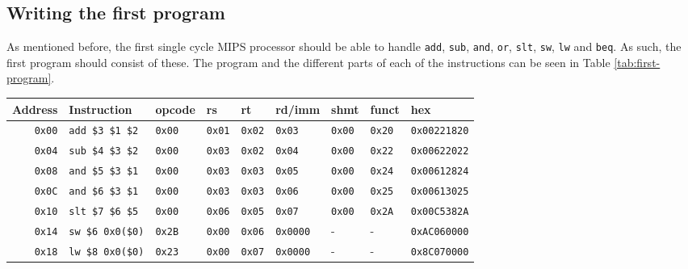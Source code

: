 \subsection{Writing the first program}
As mentioned before, the first single cycle MIPS processor should be able to
handle \texttt{add}, \texttt{sub}, \texttt{and}, \texttt{or}, \texttt{slt},
\texttt{sw}, \texttt{lw} and \texttt{beq}. As such, the first program should
consist of these. The program and the different parts of each of the
instructions can be seen in Table \ref{tab:first-program}.
\begin{table}
    \centering
    \begin{tabular}{rllllllll}
        \toprule
        Address & Instruction & opcode & rs & rt & rd/imm & shmt & funct & hex \\
        \midrule
        \texttt{0x00} & \texttt{add \$3 \$1 \$2} & \texttt{0x00} &
        \texttt{0x01} & \texttt{0x02} & \texttt{0x03} & \texttt{0x00} &
        \texttt{0x20} & \texttt{0x00221820} \\ %

        \texttt{0x04} & \texttt{sub \$4 \$3 \$2} & \texttt{0x00} &
        \texttt{0x03} & \texttt{0x02} & \texttt{0x04} & \texttt{0x00} &
        \texttt{0x22} & \texttt{0x00622022} \\ %

        \texttt{0x08} & \texttt{and \$5 \$3 \$1} & \texttt{0x00} &
        \texttt{0x03} & \texttt{0x03} & \texttt{0x05} & \texttt{0x00} &
        \texttt{0x24} & \texttt{0x00612824} \\ %

        \texttt{0x0C} & \texttt{and \$6 \$3 \$1} & \texttt{0x00} &
        \texttt{0x03} & \texttt{0x03} & \texttt{0x06} & \texttt{0x00} &
        \texttt{0x25} & \texttt{0x00613025} \\ %

        \texttt{0x10} & \texttt{slt \$7 \$6 \$5} & \texttt{0x00} &
        \texttt{0x06} & \texttt{0x05} & \texttt{0x07} & \texttt{0x00} &
        \texttt{0x2A} & \texttt{0x00C5382A} \\ %

        \texttt{0x14} & \texttt{sw \$6  0x0(\$0)} & \texttt{0x2B} &
        \texttt{0x00} & \texttt{0x06} & \texttt{0x0000} & - &
        - & \texttt{0xAC060000} \\ %

        \texttt{0x18} & \texttt{lw \$8  0x0(\$0)} & \texttt{0x23} &
        \texttt{0x00} & \texttt{0x07} & \texttt{0x0000} & - &
        - & \texttt{0x8C070000} \\ %


\end{tabular}
\end{table}
